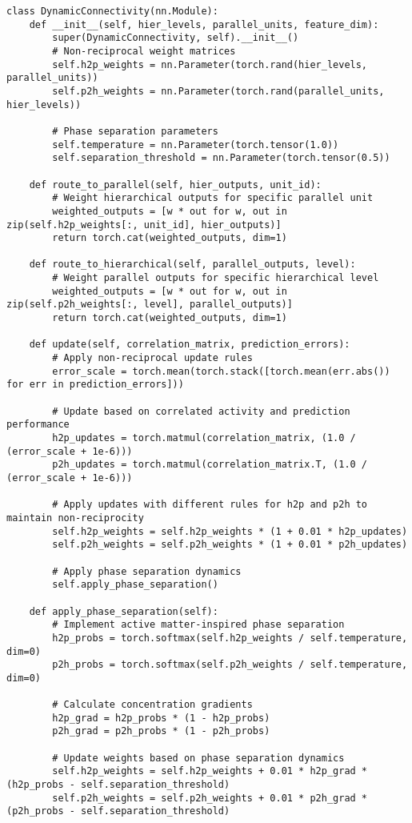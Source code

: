 \documentclass[11pt,a4paper,twocolumn]{article}
\begin{document}
\begin{lstlisting}[caption={Dynamic Connectivity PyTorch Implementation}, label={lst:dynamic-connectivity-pytorch}]
class DynamicConnectivity(nn.Module):
    def __init__(self, hier_levels, parallel_units, feature_dim):
        super(DynamicConnectivity, self).__init__()
        # Non-reciprocal weight matrices
        self.h2p_weights = nn.Parameter(torch.rand(hier_levels, parallel_units))
        self.p2h_weights = nn.Parameter(torch.rand(parallel_units, hier_levels))

        # Phase separation parameters
        self.temperature = nn.Parameter(torch.tensor(1.0))
        self.separation_threshold = nn.Parameter(torch.tensor(0.5))

    def route_to_parallel(self, hier_outputs, unit_id):
        # Weight hierarchical outputs for specific parallel unit
        weighted_outputs = [w * out for w, out in zip(self.h2p_weights[:, unit_id], hier_outputs)]
        return torch.cat(weighted_outputs, dim=1)

    def route_to_hierarchical(self, parallel_outputs, level):
        # Weight parallel outputs for specific hierarchical level
        weighted_outputs = [w * out for w, out in zip(self.p2h_weights[:, level], parallel_outputs)]
        return torch.cat(weighted_outputs, dim=1)

    def update(self, correlation_matrix, prediction_errors):
        # Apply non-reciprocal update rules
        error_scale = torch.mean(torch.stack([torch.mean(err.abs()) for err in prediction_errors]))

        # Update based on correlated activity and prediction performance
        h2p_updates = torch.matmul(correlation_matrix, (1.0 / (error_scale + 1e-6)))
        p2h_updates = torch.matmul(correlation_matrix.T, (1.0 / (error_scale + 1e-6)))

        # Apply updates with different rules for h2p and p2h to maintain non-reciprocity
        self.h2p_weights = self.h2p_weights * (1 + 0.01 * h2p_updates)
        self.p2h_weights = self.p2h_weights * (1 + 0.01 * p2h_updates)

        # Apply phase separation dynamics
        self.apply_phase_separation()

    def apply_phase_separation(self):
        # Implement active matter-inspired phase separation
        h2p_probs = torch.softmax(self.h2p_weights / self.temperature, dim=0)
        p2h_probs = torch.softmax(self.p2h_weights / self.temperature, dim=0)

        # Calculate concentration gradients
        h2p_grad = h2p_probs * (1 - h2p_probs)
        p2h_grad = p2h_probs * (1 - p2h_probs)

        # Update weights based on phase separation dynamics
        self.h2p_weights = self.h2p_weights + 0.01 * h2p_grad * (h2p_probs - self.separation_threshold)
        self.p2h_weights = self.p2h_weights + 0.01 * p2h_grad * (p2h_probs - self.separation_threshold)
\end{lstlisting}
\end{document}

